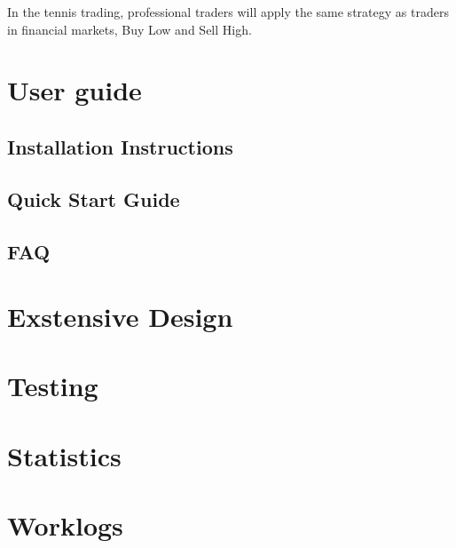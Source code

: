 \documentclass[10pt]{report}
\begin{document}
In the tennis trading, professional traders will apply the same strategy as traders in financial markets, Buy Low and Sell High. 

\chapter{User guide}

\section{Installation Instructions}

\section{Quick Start Guide}

\section{FAQ}

\chapter{Exstensive Design}

\chapter{Testing}

\chapter{Statistics}

\chapter{Worklogs}
\end{document}
